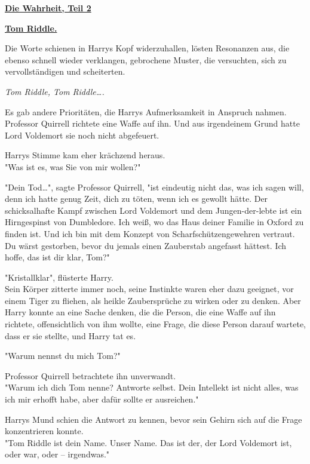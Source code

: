 

\hypertarget{die-wahrheit-teil-2}{%

\textbf{\uline{Die Wahrheit, Teil 2}}

\textbf{\uline{Tom Riddle.}}

Die Worte schienen in Harrys Kopf widerzuhallen, lösten Resonanzen aus, die ebenso schnell wieder verklangen, gebrochene Muster, die versuchten, sich zu vervollständigen und scheiterten.

\emph{Tom Riddle, Tom Riddle….}

Es gab andere Prioritäten, die Harrys Aufmerksamkeit in Anspruch nahmen. Professor Quirrell richtete eine Waffe auf ihn. Und aus irgendeinem Grund hatte Lord Voldemort sie noch nicht abgefeuert.

Harrys Stimme kam eher krächzend heraus.\\ "Was ist es, was Sie von mir wollen?"

"Dein Tod…", sagte Professor Quirrell, "ist eindeutig nicht das, was ich sagen will, denn ich hatte genug Zeit, dich zu töten, wenn ich es gewollt hätte. Der schicksalhafte Kampf zwischen Lord Voldemort und dem Jungen-der-lebte ist ein Hirngespinst von Dumbledore. Ich weiß, wo das Haus deiner Familie in Oxford zu finden ist. Und ich bin mit dem Konzept von Scharfschützengewehren vertraut. Du wärst gestorben, bevor du jemals einen Zauberstab angefasst hättest. Ich hoffe, das ist dir klar, Tom?"

"Kristallklar", flüsterte Harry.\\ Sein Körper zitterte immer noch, seine Instinkte waren eher dazu geeignet, vor einem Tiger zu fliehen, als heikle Zaubersprüche zu wirken oder zu denken. Aber Harry konnte an eine Sache denken, die die Person, die eine Waffe auf ihn richtete, offensichtlich von ihm wollte, eine Frage, die diese Person darauf wartete, dass er sie stellte, und Harry tat es.

"Warum nennst du mich Tom?"

Professor Quirrell betrachtete ihn unverwandt.\\ "Warum ich dich Tom nenne? Antworte selbst. Dein Intellekt ist nicht alles, was ich mir erhofft habe, aber dafür sollte er ausreichen."

Harrys Mund schien die Antwort zu kennen, bevor sein Gehirn sich auf die Frage konzentrieren konnte.\\ "Tom Riddle ist dein Name. Unser Name. Das ist der, der Lord Voldemort ist, oder war, oder -- irgendwas."

}
